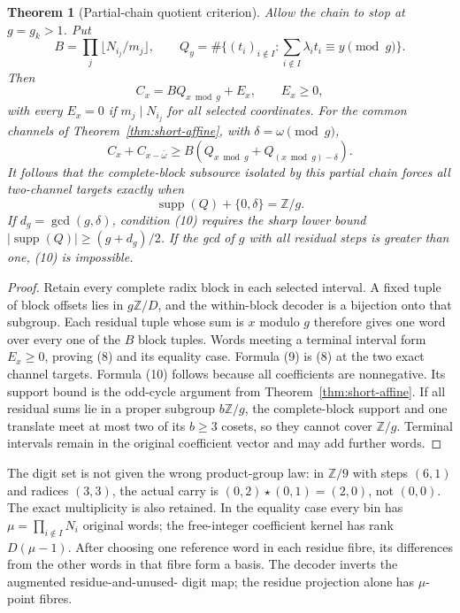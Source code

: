 \documentclass[10pt,reqno]{amsart}
\newtheorem{theorem}{Theorem}\newtheorem{proposition}[theorem]{Proposition}
\begin{document}
\begin{theorem}[Partial-chain quotient criterion]
Allow the chain to stop at $g=g_k>1$. Put
\[
 B=\prod_j\lfloor N_{i_j}/m_j\rfloor,
 \qquad
 Q_y=\#\{(t_i)_{i\notin I}:\sum_{i\notin I}\lambda_it_i\equiv y\pmod g\}.
\]
Then
\[
 C_x=BQ_{x\bmod g}+E_x,\qquad E_x\ge0,                         \tag{8}
\]
with every $E_x=0$ if $m_j\mid N_{i_j}$ for all selected coordinates. For the
common channels of Theorem~\ref{thm:short-affine}, with
$\delta=\omega\pmod g$,
\[
 C_x+C_{x-\bar\omega}
 \ge B(Q_{x\bmod g}+Q_{(x\bmod g)-\delta}).                    \tag{9}
\]
It follows that the complete-block subsource isolated by this partial chain
forces all two-channel targets exactly when
\[
 \operatorname{supp}(Q)+\{0,\delta\}=\mathbb Z/g.              \tag{10}
\]
If $d_g=\gcd(g,\delta)$, condition (10) requires the sharp lower bound
$|\operatorname{supp}(Q)|\ge(g+d_g)/2$. If the gcd of $g$ with all residual
steps is greater than one, (10) is impossible.
\end{theorem}
\begin{proof}
Retain every complete radix block in each selected interval. A fixed tuple of
block offsets lies in $g\mathbb Z/D$, and the within-block decoder is a
bijection onto that subgroup. Each residual tuple whose sum is $x$ modulo $g$
therefore gives one word over every one of the $B$ block tuples. Words meeting
a terminal interval form $E_x\ge0$, proving (8) and its equality case. Formula
(9) is (8) at the two exact channel targets. Formula (10) follows because all
coefficients are nonnegative. Its support bound is the odd-cycle argument from
Theorem~\ref{thm:short-affine}. If all residual sums lie in a proper subgroup
$b\mathbb Z/g$, the complete-block support and one translate meet at most two
of its $b\ge3$ cosets, so they cannot cover $\mathbb Z/g$. Terminal intervals
remain in the original coefficient vector and may add further words.
\end{proof}

The digit set is not given the wrong product-group law: in $\mathbb Z/9$ with
steps $(6,1)$ and radices $(3,3)$, the actual carry is
$(0,2)\star(0,1)=(2,0)$, not $(0,0)$. The exact multiplicity is also retained.
In the equality case every bin has $\mu=\prod_{i\notin I}N_i$ original words;
the free-integer coefficient kernel has rank $D(\mu-1)$. After choosing one
reference word in each residue fibre, its differences from the other words in
that fibre form a basis. The decoder inverts the augmented residue-and-unused-
digit map; the residue projection alone has $\mu$-point fibres.
\end{document}

